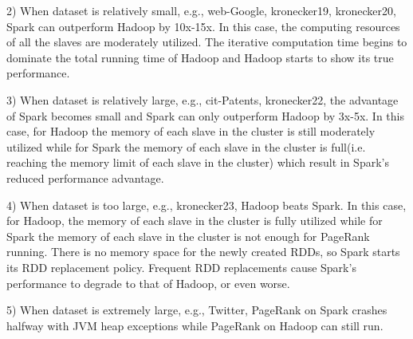 \documentclass[12pt,conference,letterpaper]{IEEEtran}
\begin{document}
2) When dataset is relatively small, e.g., web-Google, kronecker19, kronecker20, Spark can outperform Hadoop by 10x-15x. In this case, the computing resources of all the slaves are moderately utilized. The iterative computation time begins to dominate the total running time of Hadoop and Hadoop starts to show its true performance.

3) When dataset is relatively large, e.g., cit-Patents, kronecker22, the advantage of Spark becomes small and Spark can only outperform Hadoop by 3x-5x. In this case, for Hadoop the memory of each slave in the cluster is still moderately utilized while for Spark the memory of each slave in the cluster is full(i.e. reaching the memory limit of each slave in the cluster) which result in Spark's reduced performance advantage.

4) When dataset is too large, e.g., kronecker23, Hadoop beats Spark. In this case, for Hadoop, the memory of each slave in the cluster is fully utilized while for Spark the memory of each slave in the cluster is not enough for PageRank running. There is no memory space for the newly created RDDs, so Spark starts its RDD replacement policy. Frequent RDD replacements cause Spark's performance to degrade to that of Hadoop, or even worse.  

5) When dataset is extremely large, e.g., Twitter, PageRank on Spark crashes halfway with JVM heap exceptions while PageRank on Hadoop can still run.


\end{document}
